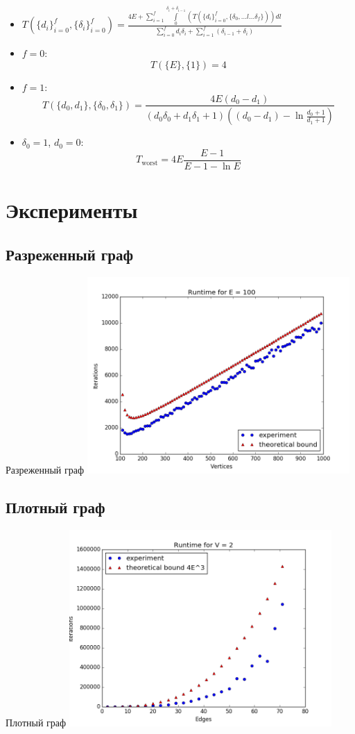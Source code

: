 \documentclass{beamer}
\def\pitem{\pause \item}
\begin{document}
 \begin{frame}
  \begin{itemize}
   \item $T(\{d_i\}_{i = 0}^f, \{\delta_i\}_{i = 0}^f) = \frac{4E + \sum_{i = 1}^f\int\limits_{0}^{\delta_i + \delta_{i - 1}} (T(\{d_i\}_{i = 0}^f, \{\delta_0, ... l ...\delta_f\}) ) dl}{\sum_{i = 0}^f d_i \delta_i + \sum_{i = 1}^f (\delta_{i - 1} + \delta_i)}$
   \pitem $f = 0$:
   $$T(\{E\}, \{1\}) = 4$$
   \pitem $f = 1$:
   $$T(\{d_0, d_1\}, \{\delta_0, \delta_1\}) = \frac{4E(d_0 - d_1)}{(d_0\delta_0 + d_1\delta_1 + 1)((d_0 - d_1) - \ln\frac{d_0 + 1}{d_1 + 1})}$$
   \pitem $\delta_0 = 1$, $d_0 = 0$:
   $$T_\text{worst} = 4E \frac{E - 1}{E - 1 - \ln E}$$
  \end{itemize}
 \end{frame}

 
 \section{Эксперименты}
 \subsection{Разреженный граф}
 \begin{frame}{Разреженный граф}
  \includegraphics[width=10cm]{pic/rarefied_graph.png}
 \end{frame}
 
 \subsection{Плотный граф}
 \begin{frame}{Плотный граф}
   \includegraphics[width=10cm]{pic/dense_graph.png}
 \end{frame}
 
\end{document}
